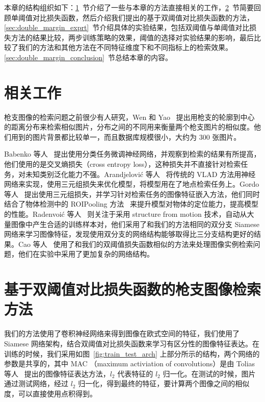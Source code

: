 本章的结构组织如下：\ref{sec:double_margin_related_work}~节介绍了一些与本章的方法直接相关的工作，\ref{sec:double_margin_method}~节简要回顾单阈值对比损失函数，然后介绍我们提出的基于双阈值对比损失函数的方法，\ref{sec:double_margin_exprt}~节介绍具体的实验结果，包括双阈值与单阈值对比损失方法的结果比较，两步训练策略的效果，阈值的选择对实验结果的影响，最后比较了我们的方法和其他方法在不同特征维度下和不同指标上的检索效果。\ref{sec:double_margin_conclusion}~节总结本章的内容。

\section{相关工作}\label{sec:double_margin_related_work}
枪支图像的检索问题之前很少有人研究，Wen 和 Yao~\cite{Wen2005PistolIR} 提出用枪支的轮廓到中心的距离分布来检索相似图片，分布之间的不同用来衡量两个枪支图片的相似度。他们用到的图片背景都比较单一，而且数据库规模很小，大约为 300 张图片。

Babenko 等人~\cite{Babenko2014NeuralCF} 提出使用分类任务微调神经网络，并观察到检索的结果有所提高，他们使用的是交叉熵损失（cross entropy loss），这种损失并不直接针对检索任务，对未知类别泛化能力不强。Arandjelovi{\'c} 等人~\cite{Arandjelovic2016NetVLADCA} 将传统的 VLAD 方法用神经网络来实现，使用三元组损失来优化模型，将模型用在了地点检索任务上。Gordo 等人~\cite{Gordo2016DeepIR} 提出使用三元组损失，并学习针对检索任务的图像特征嵌入方法，他们同时结合了物体检测中的 ROIPooling 方法~\cite{Ren2017FasterRT} 来提升模型对物体的定位能力，提高模型的性能。Radenvoi{\'c} 等人~\cite{Radenovic2016CNNIR} 则关注于采用 structure from motion 技术，自动从大量图像中产生合适的训练样本对，他们采用了和我们的方法相同的双分支 Siamese 网络来学习图像特征，发现使用双分支的网络结构能够取得比三分支结构更好的结果。Cao 等人~\cite{Cao2016QuartetnetLF} 使用了和我们的双阈值损失函数相似的方法来处理图像实例检索问题，他们在实验中采用了更加复杂的网络结构。

\section{基于双阈值对比损失函数的枪支图像检索方法}\label{sec:double_margin_method}

我们的方法使用了卷积神经网络来得到图像在欧式空间的特征，我们使用了 Siamese 网络架构，结合双阈值对比损失函数来学习有区分性的图像特征表达。在训练的时候，我们采用如图~\ref{fig:train_test_arch} 上部分所示的结构，两个网络的参数是共享的，其中 MAC （maximum activiation of convolutions）是由 Tolias 等人~\cite{Tolias2015ParticularOR} 提出的图像特征表达方法，$l_2$ 代表特征的 $l_2$ 归一化。在测试的时候，图片通过测试网络，经过 $l_2$ 归一化，得到最终的特征，要计算两个图像之间的相似度，可以直接使用点积得到。

